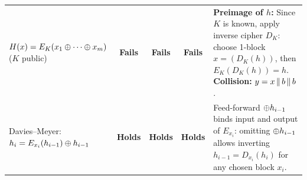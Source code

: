 \begin{table}[h!]
\begin{tabularx}{\textwidth}{@{}L{4.3cm} c c c Y@{}}
$H(x) = E_K(x_1 \oplus \cdots \oplus x_m)$ ($K$ public) & \textbf{Fails} & \textbf{Fails} & \textbf{Fails} & \textbf{Preimage of $h$:} Since $K$ is known, apply inverse cipher $D_K$: choose 1-block $x = (D_K(h))$, then $E_K(D_K(h)) = h$. \textbf{Collision:} $y = x \,\|\, b \,\|\, b$. \\
Davies--Meyer: $h_i = E_{x_i}(h_{i-1}) \oplus h_{i-1}$ & \textbf{Holds} & \textbf{Holds} & \textbf{Holds} & Feed-forward $\oplus h_{i-1}$ binds input and output of $E_{x_i}$: omitting $\oplus h_{i-1}$ allows inverting $h_{i-1} = D_{x_i}(h_i)$ for any chosen block $x_i$. \\
\bottomrule
\end{tabularx}
\end{table}
